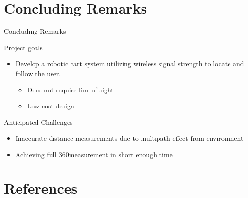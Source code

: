 \documentclass{beamer}
\begin{document}



\section{Concluding Remarks}
\begin{frame}{Concluding Remarks}
  \begin{block}{Project goals}
    \begin{LARGE}
      \begin{itemize}
        \item Develop a robotic cart system utilizing wireless signal strength to locate and follow the user.
        \begin{itemize}
          \item Does not require line-of-sight
          \item Low-cost design
        \end{itemize}
      \end{itemize}
    \end{LARGE}
  \end{block}
  \begin{block}{Anticipated Challenges}
    \begin{itemize}
      \item Inaccurate distance measurements due to multipath effect from environment
      \item Achieving full 360\textdegree measurement in short enough time
    \end{itemize}
  \end{block}
\end{frame}


\section{References}
\end{document}

